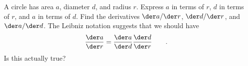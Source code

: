 A circle has area $a$, diameter $d$, and radius $r$.
Express $a$ in terms of $r$,
$d$ in terms of $r$, and
$a$ in terms of $d$.
Find the derivatives $\der a/\der r$, $\der d/\der r$, and $\der a/\der d$.
The Leibniz notation suggests that we should have
\begin{equation*}
  \frac{\der a}{\der r} = \frac{\der a}{\der d}  \frac{\der d}{\der r}   \qquad .
\end{equation*}
Is this actually true?
